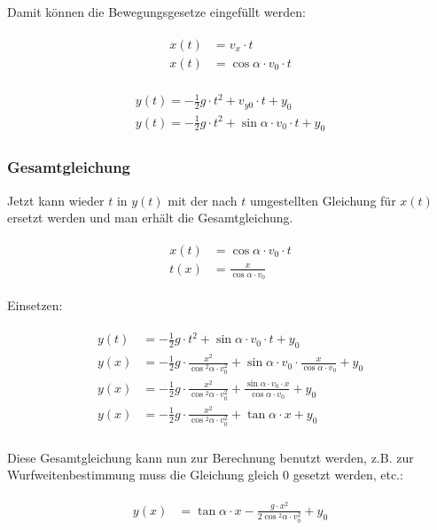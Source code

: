 \noindent Damit können die Bewegungsgesetze eingefüllt werden:

\begin{align}
\begin{split}
	x(t) &= v_x \cdot t \\
	x(t) &= \cos{\alpha} \cdot v_0 \cdot t
\end{split}
\end{align}

\begin{align}
\begin{split}
	y(t) = -\frac{1}{2}g \cdot t^2 + v_{y0} \cdot t + y_0 \\
	y(t) = -\frac{1}{2}g \cdot t^2 + \sin{\alpha} \cdot v_0 \cdot t + y_0
\end{split}
\end{align}


\subsubsection{Gesamtgleichung}


Jetzt kann wieder $t$ in $y(t)$ mit der nach $t$ umgestellten Gleichung für $x(t)$ ersetzt werden und man erhält die Gesamtgleichung.

\begin{align}
\begin{split}
	x(t) &= \cos{\alpha} \cdot v_0 \cdot t \\
	t(x) &= \frac{x}{\cos{\alpha} \cdot v_0}
\end{split}
\end{align}

\noindent Einsetzen:

\begin{align}
\begin{split}
	y(t) &= -\frac{1}{2}g \cdot t^2 + \sin{\alpha} \cdot v_0 \cdot t + y_0 \\
	y(x) &= -\frac{1}{2}g \cdot \frac{x^2}{\cos{^2\alpha} \cdot v_0^2} + \sin{\alpha} \cdot v_0 \cdot \frac{x}{\cos{\alpha} \cdot v_0} + y_0 \\
	y(x) &= -\frac{1}{2}g \cdot \frac{x^2}{\cos{^2\alpha} \cdot v_0^2} + \frac{\sin{\alpha} \cdot v_0 \cdot x}{\cos{\alpha} \cdot v_0} + y_0 \\
	y(x) &= -\frac{1}{2}g \cdot \frac{x^2}{\cos{^2\alpha} \cdot v_0^2} + \tan{\alpha} \cdot x + y_0 \\
\end{split}
\end{align}

\noindent Diese Gesamtgleichung kann nun zur Berechnung benutzt werden, z.B. zur Wurfweitenbestimmung muss die Gleichung gleich $0$ gesetzt werden, etc.:

\begin{align}
\begin{split}
	y(x) &= \tan{\alpha} \cdot x - \frac{g \cdot x^2}{2\cos{^2\alpha} \cdot v_0^2} + y_0
\end{split}
\end{align}